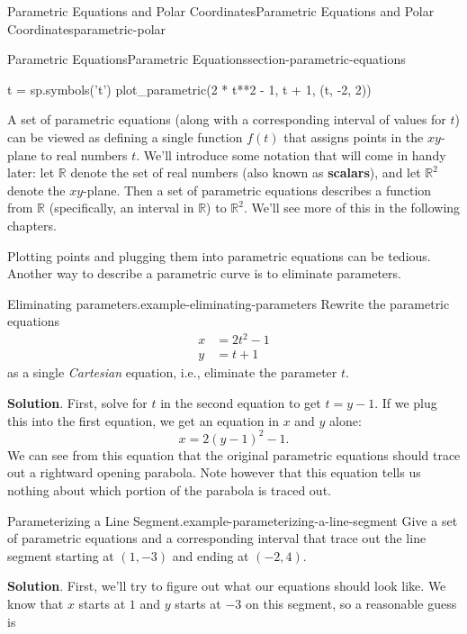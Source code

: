 \documentclass[oneside,10pt,]{book}
\newcommand{\terminology}[1]{\textbf{#1}}
\numberwithin{equation}{section}
\newcommand{\amp}{&}
\begin{document}
\begin{chapterptx}{Parametric Equations and Polar Coordinates}{}{Parametric Equations and Polar Coordinates}{}{}{parametric-polar}
\begin{sectionptx}{Parametric Equations}{}{Parametric Equations}{}{}{section-parametric-equations}
\begin{sageinput}
t = sp.symbols('t')
plot_parametric(2 * t**2 - 1, t + 1, (t, -2, 2))
\end{sageinput}
\hypertarget{p-991}{}%
A set of parametric equations (along with a corresponding interval of values for \(t\)) can be viewed as defining a single function \(f(t)\) that assigns points in the \(xy\)-plane to real numbers \(t\). We'll introduce some notation that will come in handy later: let \(\mathbb{R}\) denote the set of real numbers (also known as \terminology{scalars}), and let \(\mathbb{R}^{2}\) denote the \(xy\)-plane. Then a set of parametric equations describes a function from \(\mathbb{R}\) (specifically, an interval in \(\mathbb{R}\)) to \(\mathbb{R}^{2}\). We'll see more of this in the following chapters.%
\par
\hypertarget{p-992}{}%
Plotting points and plugging them into parametric equations can be tedious. Another way to describe a parametric curve is to eliminate parameters.%
\begin{example}{Eliminating parameters.}{example-eliminating-parameters}%
\hypertarget{p-993}{}%
Rewrite the parametric equations%
%
\begin{align*}
x \amp = 2t^{2}-1 \\
y \amp = t+1 
\end{align*}
as a single \emph{Cartesian} equation, i.e., eliminate the parameter \(t\).\par\smallskip%
\noindent\textbf{Solution}.\hypertarget{solution-199}{}\quad%
\hypertarget{p-994}{}%
First, solve for \(t\) in the second equation to get \(t = y-1\). If we plug this into the first equation, we get an equation in \(x\) and \(y\) alone:%
%
\begin{equation*}
x = 2(y-1)^{2}-1.
\end{equation*}
\hypertarget{p-995}{}%
We can see from this equation that the original parametric equations should trace out a rightward opening parabola. Note however that this equation tells us nothing about which portion of the parabola is traced out.%
\end{example}
\begin{example}{Parameterizing a Line Segment.}{example-parameterizing-a-line-segment}%
\hypertarget{p-996}{}%
Give a set of parametric equations and a corresponding interval that trace out the line segment starting at \((1,-3)\) and ending at \((-2,4)\).%
\par\smallskip%
\noindent\textbf{Solution}.\hypertarget{solution-200}{}\quad%
\hypertarget{p-997}{}%
First, we'll try to figure out what our equations should look like. We know that \(x\) starts at \(1\) and \(y\) starts at \(-3\) on this segment, so a reasonable guess is%

\end{example}
\end{sectionptx}
\end{chapterptx}
\end{document}
